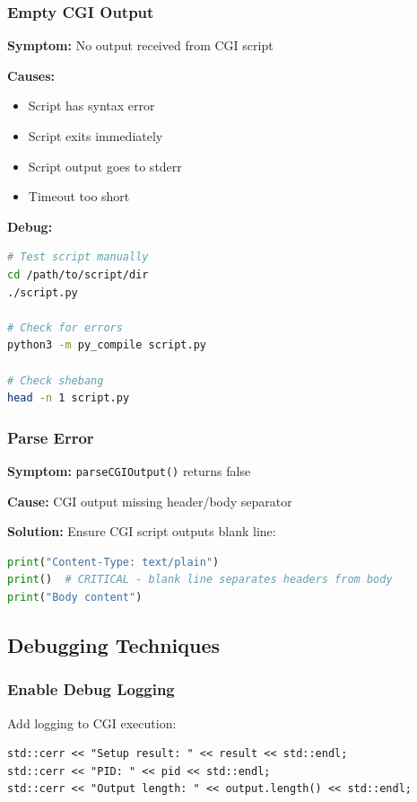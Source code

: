\documentclass[11pt,a4paper]{article}
\begin{document}
\subsubsection{Empty CGI Output}

\textbf{Symptom:} No output received from CGI script

\textbf{Causes:}
\begin{itemize}
    \item Script has syntax error
    \item Script exits immediately
    \item Script output goes to stderr
    \item Timeout too short
\end{itemize}

\textbf{Debug:}
\begin{lstlisting}[language=bash]
# Test script manually
cd /path/to/script/dir
./script.py

# Check for errors
python3 -m py_compile script.py

# Check shebang
head -n 1 script.py
\end{lstlisting}

\subsubsection{Parse Error}

\textbf{Symptom:} \texttt{parseCGIOutput()} returns false

\textbf{Cause:} CGI output missing header/body separator

\textbf{Solution:} Ensure CGI script outputs blank line:
\begin{lstlisting}[language=Python]
print("Content-Type: text/plain")
print()  # CRITICAL - blank line separates headers from body
print("Body content")
\end{lstlisting}

\subsection{Debugging Techniques}

\subsubsection{Enable Debug Logging}

Add logging to CGI execution:

\begin{lstlisting}
std::cerr << "Setup result: " << result << std::endl;
std::cerr << "PID: " << pid << std::endl;
std::cerr << "Output length: " << output.length() << std::endl;
\end{lstlisting}
\end{document}

